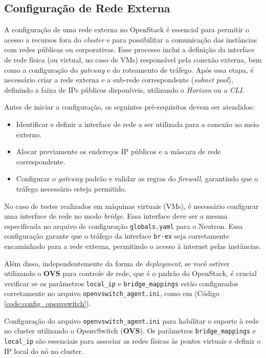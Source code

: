 \subsection{Configuração de Rede Externa}
A configuração de uma rede externa no OpenStack é essencial para permitir o acesso a recursos fora do \textit{cluster} e para possibilitar a comunicação das instâncias com redes públicas ou corporativas. Esse processo inclui a definição da interface de rede física (ou virtual, no caso de VMs) responsável pela conexão externa, bem como a configuração do \textit{gateway} e do roteamento de tráfego. Após essa etapa, é necessário criar a rede externa e a sub-rede correspondente (\textit{subnet pool}), definindo a faixa de IPs públicos disponíveis, utilizando o \textit{Horizon} ou a \textit{CLI}.

Antes de iniciar a configuração, os seguintes pré-requisitos devem ser atendidos:
\begin{itemize}
    \item Identificar e definir a interface de rede a ser utilizada para a conexão ao meio externo.
    \item Alocar previamente os endereços IP públicos e a máscara de rede correspondente.
    \item Configurar o \textit{gateway} padrão e validar as regras do \textit{firewall}, garantindo que o tráfego necessário esteja permitido.
\end{itemize}

No caso de testes realizados em máquinas virtuais (VMs), é necessário configurar uma interface de rede no modo \textit{bridge}. Essa interface deve ser a mesma especificada no arquivo de configuração \texttt{globals.yaml} para o Neutron. Essa configuração garante que o tráfego da interface \texttt{br-ex} seja corretamente encaminhado para a rede externa, permitindo o acesso à internet pelas instâncias. 

Além disso, independentemente da forma de \textit{deployment}, se você estiver utilizando o \textbf{OVS} para controle de rede, que é o padrão do OpenStack, é crucial verificar se os parâmetros \texttt{local\_ip} e \texttt{bridge\_mappings} estão configurados corretamente no arquivo \texttt{openvswitch\_agent.ini}, como em (Código \ref{code:config_openvswitch}).


\begin{listing}[h!]
    \noindent{}  
  \caption{Configuração do arquivo \texttt{openvswitch\_agent.ini} para habilitar o suporte à rede no cluster utilizando o OpenvSwitch (\textbf{OVS}). Os parâmetros \texttt{bridge\_mappings} e \texttt{local\_ip} são essenciais para associar as redes físicas às pontes virtuais e definir o IP local do nó no cluster.}
  \label{code:config_openvswitch}
\end{listing}

